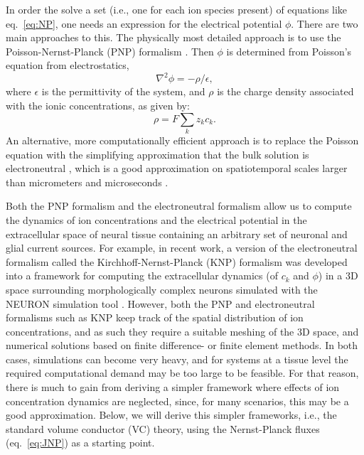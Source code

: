 \documentclass[preprint,11pt,authoryear]{elsarticle}
\begin{document}
\begin{itemize}
\begin{itemize}
In order the solve a set (i.e., one for each ion species present) of equations like eq.~\ref{eq:NP}, one needs an expression for the electrical potential $\phi$. There are two main approaches to this. The physically most detailed approach is to use the Poisson-Nernst-Planck (PNP) formalism \citep{Leonetti1998, Leonetti2004, Lu2007, Lopreore2008, Nanninga2008, Pods2013, Gardner2015}. Then $\phi$ is determined from Poisson's equation from electrostatics, 
\begin{equation}
\nabla^2 \phi = -\rho/\epsilon, 
\label{eq:poisson}
\end{equation}
where $\epsilon$ is the permittivity of the system, and $\rho$ is the charge density associated with the ionic concentrations, as given by:
\begin{equation}
\rho = F \sum_k z_k c_k.
\label{eq:F}
\end{equation}
An alternative, more computationally efficient approach is to replace the Poisson equation with the simplifying approximation that the bulk solution is electroneutral \citep{Mori2008, Mori2009, Mori2009a, Mori2011, Halnes2015, Halnes2013, Pods2017, Niederer2013, OConnell2016, Solbra2018}, which is a good approximation on spatiotemporal scales larger than micrometers and microseconds \citep{Grodzinsky2011, Pods2017, Solbra2018}. 

Both the PNP formalism and the electroneutral formalism allow us to compute the dynamics of ion concentrations and the electrical potential in the extracellular space of neural tissue containing an arbitrary set of neuronal and glial current sources. For example, in recent work, a version of the electroneutral formalism called the Kirchhoff-Nernst-Planck (KNP) formalism was developed into a framework for computing the extracellular dynamics (of $c_k$ and $\phi$) in a 3D space surrounding morphologically complex neurons simulated with the NEURON simulation tool \citep{Solbra2018}. However, both the PNP and electroneutral formalisms such as KNP keep track of the spatial distribution of ion concentrations, and as such they require a suitable meshing of the 3D space, and numerical solutions based on finite difference- or finite element methods. In both cases, simulations can become very heavy, and for systems at a tissue level the required computational demand may be too large to be feasible. For that reason, there is much to gain from deriving a simpler framework where effects of ion concentration dynamics are neglected, since, for many scenarios, this may be a good approximation. Below, we will derive this simpler frameworks, i.e., the standard volume conductor (VC) theory, using the Nernst-Planck fluxes (eq.~\ref{eq:JNP}) as a starting point.


\end{itemize}
\end{itemize}
\end{document}

